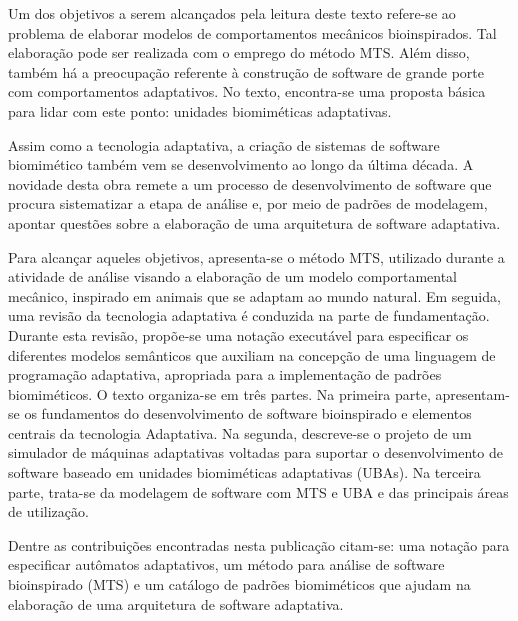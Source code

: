 Um dos objetivos a serem alcançados pela leitura deste texto refere-se ao problema de elaborar modelos de comportamentos mecânicos bioinspirados. Tal elaboração pode ser realizada com o emprego do método MTS. Além disso, também há a preocupação referente à construção de software de grande porte com comportamentos adaptativos. No texto, encontra-se uma proposta básica para lidar com este ponto: unidades biomiméticas adaptativas.


Assim como a tecnologia adaptativa, a criação de sistemas de software biomimético também vem se desenvolvimento ao longo da última década. A novidade desta obra remete a um processo de desenvolvimento de software que procura sistematizar a etapa de análise e, por meio de padrões de modelagem, apontar questões sobre a elaboração de uma arquitetura de software adaptativa.

Para alcançar aqueles objetivos, apresenta-se o método MTS, utilizado durante a atividade de análise visando a elaboração de um modelo comportamental mecânico, inspirado em animais que se adaptam ao mundo natural. Em seguida, uma revisão da tecnologia adaptativa é conduzida na parte de fundamentação. Durante esta revisão, propõe-se uma notação executável para especificar os diferentes modelos semânticos que auxiliam na concepção de uma linguagem de programação adaptativa, apropriada para a implementação de padrões biomiméticos. O texto organiza-se em três partes. Na primeira parte, apresentam-se os fundamentos do desenvolvimento de software bioinspirado e elementos centrais da tecnologia Adaptativa. Na segunda, descreve-se o projeto de um simulador de máquinas adaptativas voltadas para suportar o desenvolvimento de software baseado em unidades biomiméticas adaptativas (UBAs). Na terceira parte, trata-se da modelagem de software com MTS e UBA e das principais áreas de utilização.

Dentre as contribuições encontradas nesta publicação citam-se: uma notação para especificar autômatos adaptativos, um método para análise de software bioinspirado (MTS) e um catálogo de padrões biomiméticos que ajudam na elaboração de uma arquitetura de software adaptativa.
